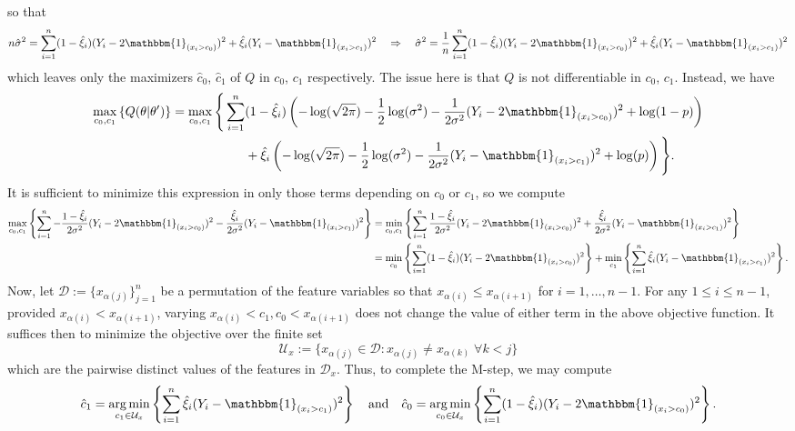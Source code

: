\documentclass[10pt]{article}
\newcommand{\bp}[1]{\left({#1}\right)}
\newcommand{\1}[1]{\mathbbm{1}_{#1}}
\newcommand{\mc}[1]{\mathcal{#1}}
\DeclareMathOperator{\argmin}{arg\,min}
\begin{document}
so that
\begin{align*}
    n\hat{\sigma}^2=\sum_{i=1}^n(1-\hat{\xi}_i)(Y_i-2\mathbbm{1}_{(x_i>c_0)})^2+\hat{\xi}_i(Y_i-\mathbbm{1}_{(x_i>c_1)})^2\quad\Rightarrow\quad\hat{\sigma}^2=\frac{1}{n}\sum_{i=1}^n(1-\hat{\xi}_i)(Y_i-2\mathbbm{1}_{(x_i>c_0)})^2+\hat{\xi}_i(Y_i-\mathbbm{1}_{(x_i>c_1)})^2
\end{align*}
which leaves only the maximizers $\hat{c}_0$, $\hat{c}_1$ of $Q$ in $c_0$, $c_1$ respectively. The issue here is that $Q$ is not differentiable in $c_0$, $c_1$. Instead, we have
\begin{align*}
    \max_{c_0,c_1}\left\{Q(\theta|\theta^\prime)\right\}=\max_{c_0,c_1}\Bigg\{\sum_{i=1}^n&(1-\hat{\xi}_i)\bp{-\log(\sqrt{2\pi})-\frac{1}{2}\log(\sigma^2)-\frac{1}{2\sigma^2}(Y_i-2\mathbbm{1}_{(x_i>c_0)})^2+\log(1-p)}\\
    &+\hat{\xi}_i\bp{-\log(\sqrt{2\pi})-\frac{1}{2}\log(\sigma^2)-\frac{1}{2\sigma^2}(Y_i-\mathbbm{1}_{(x_i>c_1)})^2+\log(p)}\Bigg\}.
\end{align*}
It is sufficient to minimize this expression in only those terms depending on $c_0$ or $c_1$, so we compute
\begin{align*}
    \max_{c_0,c_1}\left\{\sum_{i=1}^n-\frac{1-\hat{\xi}_i}{2\sigma^2}(Y_i-2\mathbbm{1}_{(x_i>c_0)})^2-\frac{\hat{\xi}_i}{2\sigma^2}(Y_i-\mathbbm{1}_{(x_i>c_1)})^2\right\}&=\min_{c_0,c_1}\left\{\sum_{i=1}^n\frac{1-\hat{\xi}_i}{2\sigma^2}(Y_i-2\mathbbm{1}_{(x_i>c_0)})^2+\frac{\hat{\xi}_i}{2\sigma^2}(Y_i-\mathbbm{1}_{(x_i>c_1)})^2\right\}\\
    &=\min_{c_0}\left\{\sum_{i=1}^n(1-\hat{\xi}_i)(Y_i-2\mathbbm{1}_{(x_i>c_0)})^2\right\}+\min_{c_1}\left\{\sum_{i=1}^n\hat{\xi}_i(Y_i-\mathbbm{1}_{(x_i>c_1)})^2\right\}.
\end{align*} 
Now, let $\mc{D}:=\{x_{\alpha(j)}\}_{j=1}^n$ be a permutation of the feature variables so that $x_{\alpha(i)}\leq x_{\alpha(i+1)}$ for $i=1,\dots,n-1$. For any $1\leq i\leq n-1$, provided $x_{\alpha(i)}<x_{\alpha(i+1)}$, varying $x_{\alpha(i)}<c_1,c_0<x_{\alpha(i+1)}$ does not change the value of either term in the above objective function. It suffices then to minimize the objective over the finite set
\[\mc{U}_x:=\{x_{\alpha(j)}\in\mc{D}:x_{\alpha(j)}\neq x_{\alpha(k)}\;\forall k<j\}\]
which are the pairwise distinct values of the features in $\mc{D}_x$. Thus, to complete the M-step, we may compute
\begin{align*}
    \hat{c}_1=\argmin_{c_1\in\mc{U}_x}\left\{\sum_{i=1}^n\hat{\xi}_i(Y_i-\mathbbm{1}_{(x_i>c_1)})^2\right\}\quad\text{and}\quad\hat{c}_0=\argmin_{c_0\in\mc{U}_x}\left\{\sum_{i=1}^n(1-\hat{\xi}_i)(Y_i-2\mathbbm{1}_{(x_i>c_0)})^2\right\}.
\end{align*}
\end{document}

